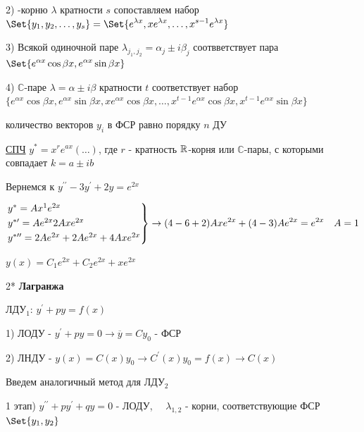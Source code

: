 \documentclass[12pt]{article}
\begin{document}
    2) \Real-корню $\lambda$ кратности $s$ сопоставляем набор $\displaystyle \Set{y_1, y_2, \dots, y_s} = \Set{e^{\lambda x}, xe^{\lambda x}, \dots, x^{s - 1} e^{\lambda x}}$

    3) Всякой одиночной паре $\displaystyle \lambda_{j_1,j_2} = \alpha_j \pm i\beta_j$ соотвветствует пара $\displaystyle \Set{e^{\alpha x} \cos\beta x, e^{\alpha x} \sin\beta x}$

    4) $\mathbb{C}$-паре $\lambda = \alpha \pm i\beta$ кратности $t$ соответствует набор $\displaystyle \{e^{\alpha x} \cos \beta x, e^{\alpha x} \sin \beta x, x e^{\alpha x} \cos \beta x, \dots, x^{t - 1}e^{\alpha x} \cos\beta x, x^{t - 1}e^{\alpha x} \sin\beta x\}$

    \Nota количество векторов $\displaystyle y_i$ в ФСР равно порядку $n$ ДУ

    \underline{СПЧ} $\displaystyle y^* = x^r e^{ax} (\dots)$, где $r$ - кратность $\mathbb{R}$-корня или $\mathbb{C}$-пары, с которыми совпадает $k = a \pm ib$

    \Ex Вернемся к $\displaystyle y^{\prime\prime} - 3y^\prime + 2y = e^{2x}$

    $\displaystyle \begin{rcases*}
    y^* = Ax^1 e^{2x} \\

    y^{*\prime} = Ae^{2x} 2Axe^{2x} \\

    y^{*\prime\prime} = 2Ae^{2x} + 2Ae^{2x} + 4Axe^{2x}
    \end{rcases*} \to (4 - 6 + 2) Axe^{2x} + (4 - 3) Ae^{2x} = e^{2x} \quad A = 1$

    $\displaystyle y(x) = C_1 e^{2x} + C_2 e^{2x} + xe^{2x}$

    \vspace{10mm}

    2* \textbf{Лагранжа}

    \Mem ЛДУ$\displaystyle _1$: $\displaystyle y^\prime + py = f(x)$

    1) ЛОДУ - $\displaystyle y^\prime + py = 0 \to \overline{y} = Cy_0$ - ФСР

    2) ЛНДУ - $\displaystyle y(x) = C(x)y_0 \longrightarrow C^\prime(x) y_0 = f(x) \to C(x)$

    \Nota Введем аналогичный метод для ЛДУ$\displaystyle _2$

    1 этап) $\displaystyle y^{\prime\prime} + py^\prime + qy = 0$ - ЛОДУ, $\displaystyle \quad \lambda_{1, 2}$ - корни, соответствующие ФСР $\displaystyle \Set{y_1, y_2}$
\end{document}

